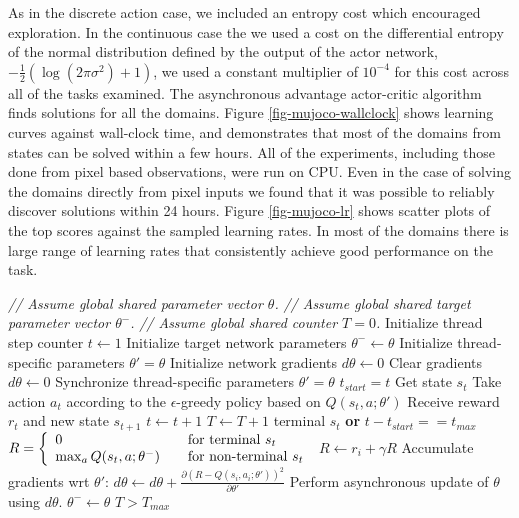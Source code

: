 \documentclass{article} %
\begin{document}
As in the discrete action case, we included an entropy cost which encouraged exploration.
In the continuous case the we used a cost on the differential entropy of the normal distribution defined by
the output of the actor network, $-\frac{1}{2}(\log(2\pi\sigma^2)+1)$, we used a constant multiplier of $10^{-4}$ for this cost across all of the tasks
examined.
%
The asynchronous advantage actor-critic algorithm finds solutions for all the domains.  Figure \ref{fig-mujoco-wallclock}
shows learning curves against wall-clock time, and demonstrates that most of the domains from
states can be solved within a few hours. All of the experiments, including those done
from pixel based observations, were run on CPU.  Even in the case of solving the domains
directly from pixel inputs we found that it was possible to reliably discover solutions
within 24 hours.
Figure \ref{fig-mujoco-lr} shows scatter plots of the top scores against the sampled learning rates.
In most of the domains there is large range of learning rates that consistently achieve good performance
on the task.

%

%
%
%
%
%
%
%
%
%
%


\begin{algorithm}[h]
\caption{Asynchronous n-step Q-learning - pseudocode for each actor-learner thread.}
\begin{algorithmic}
\small
\State \emph{// Assume global shared parameter vector $\theta$.}
\State \emph{// Assume global shared target parameter vector $\theta^-$.}
\State \emph{// Assume global shared counter $T=0$.}
\State Initialize thread step counter $t\gets 1$
\State Initialize target network parameters $\theta^- \gets \theta$
\State Initialize thread-specific parameters $\theta' = \theta$
\State Initialize network gradients $d\theta \gets 0$
\Repeat
\State Clear gradients $d\theta \gets 0$
\State Synchronize thread-specific parameters $\theta'=\theta$
\State $t_{start} = t$
\State Get state $s_t$
\Repeat
\State Take action $a_t$ according to the $\epsilon$-greedy policy based on $Q(s_t,a;\theta')$
\State Receive reward $r_t$ and new state $s_{t+1}$
\State $t \gets t + 1$
\State $T \gets T + 1$
\Until terminal $s_t$ \textbf{or} $t - t_{start} == t_{max}$
\State $R =
    \left\{
    \begin{array}{l l}
      0  \quad & \text{for terminal } s_t\\
      \max_a Q(s_t,a;\theta^-) \quad & \text{for non-terminal } s_t
    \end{array} \right.$
\State $R \gets r_i + \gamma R$
\State Accumulate gradients wrt $\theta'$: $d\theta \gets d\theta + \frac{\partial\left(R - Q(s_i,a_i;\theta')\right)^2}{\partial \theta'}$
\EndFor
\State Perform asynchronous update of $\theta$ using $d\theta$.
%
\State $\theta^- \gets \theta$
\EndIf
\Until $T > T_{max}$
\end{algorithmic}
\label{alg:msq}
\end{algorithm}
\end{document}
